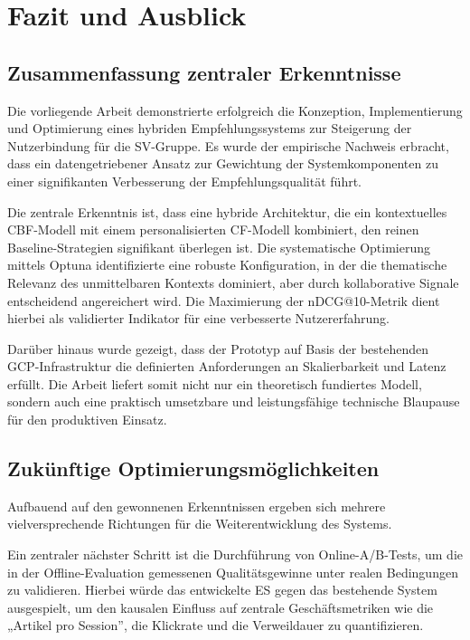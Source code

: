 \section{Fazit und Ausblick} %

\subsection{Zusammenfassung zentraler Erkenntnisse}
Die vorliegende Arbeit demonstrierte erfolgreich die Konzeption, 
Implementierung und Optimierung eines hybriden Empfehlungssystems zur 
Steigerung der Nutzerbindung für die \ac{SV-Gruppe}. 
Es wurde der empirische Nachweis erbracht, dass ein datengetriebener 
Ansatz zur Gewichtung der Systemkomponenten zu einer signifikanten Verbesserung 
der Empfehlungsqualität führt.

Die zentrale Erkenntnis ist, dass eine hybride Architektur, 
die ein kontextuelles \ac{CBF}-Modell mit einem personalisierten 
\ac{CF}-Modell kombiniert, den reinen Baseline-Strategien signifikant überlegen ist. 
Die systematische Optimierung mittels Optuna identifizierte eine robuste 
Konfiguration, in der die thematische Relevanz des unmittelbaren Kontexts dominiert, 
aber durch kollaborative Signale entscheidend angereichert wird. 
Die Maximierung der \ac{nDCG}@10-Metrik dient hierbei als validierter Indikator 
für eine verbesserte Nutzererfahrung.

Darüber hinaus wurde gezeigt, dass der Prototyp auf Basis der bestehenden 
\ac{GCP}-Infrastruktur die definierten Anforderungen an Skalierbarkeit und 
Latenz erfüllt. Die Arbeit liefert somit nicht nur ein theoretisch 
fundiertes Modell, sondern auch eine praktisch umsetzbare und leistungsfähige 
technische Blaupause für den produktiven Einsatz.

\subsection{Zukünftige Optimierungsmöglichkeiten}
Aufbauend auf den gewonnenen Erkenntnissen ergeben sich mehrere vielversprechende
Richtungen für die Weiterentwicklung des Systems.

Ein zentraler nächster Schritt ist die Durchführung von Online-A/B-Tests, 
um die in der Offline-Evaluation gemessenen Qualitätsgewinne unter realen 
Bedingungen zu validieren. Hierbei würde das entwickelte \ac{ES} gegen das 
bestehende System ausgespielt, um den kausalen Einfluss auf zentrale 
Geschäftsmetriken wie die „Artikel pro Session”, 
die Klickrate und die Verweildauer zu quantifizieren.

